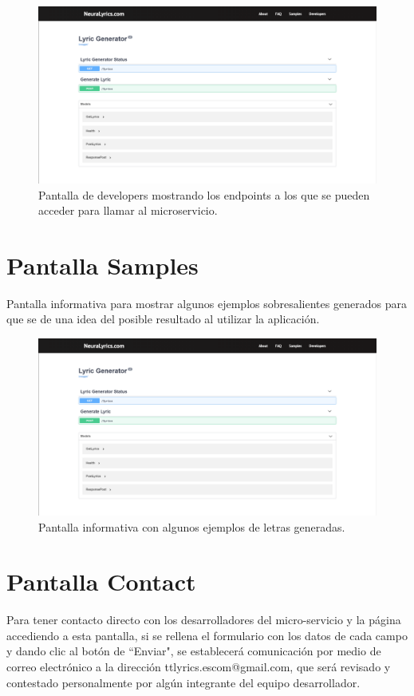 \documentclass[12pt, a4paper, titlepage]{article}
\begin{document}
		\begin{figure}[H] 
			\includegraphics[width=13.5cm]{./Imagenes/Capturas/pdev.png}
			\centering \caption{Pantalla de developers mostrando los endpoints a los que se pueden acceder para llamar al microservicio.}
		\end{figure}
		
		\section{Pantalla Samples}
		Pantalla informativa para mostrar algunos ejemplos sobresalientes generados para que se de una idea del posible resultado al utilizar la aplicación.
		
		\begin{figure}[H] 
			\includegraphics[width=13.5cm]{./Imagenes/Capturas/pdev.png}
			\centering \caption{Pantalla informativa con algunos ejemplos de letras generadas.}
		\end{figure}
	
		\section{Pantalla Contact}
		Para tener contacto directo con los desarrolladores del micro-servicio y la página accediendo a esta pantalla, si se rellena el formulario con los datos de cada campo y dando clic al botón de “Enviar", se establecerá comunicación por medio de correo electrónico a la dirección ttlyrics.escom@gmail.com, que será revisado y contestado personalmente por algún integrante del equipo desarrollador.
		
\end{document}
